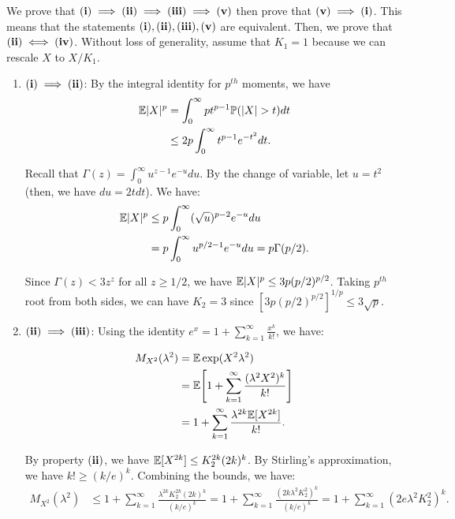\begin{proof*}
	We prove that ${\bf (i)}\implies{\bf (ii)}\implies{\bf (iii)}\implies{\bf (v)}$ then prove that ${\bf (v)}\implies{\bf (i)}$. This means that the statements ${\bf (i)}, {\bf (ii)}, {\bf (iii)}, {\bf (v)}$ are equivalent. Then, we prove that ${\bf (ii)} \iff {\bf (iv)}$. Without loss of generality, assume that $K_1=1$ because we can rescale $X$ to $X/K_1$.
	\begin{enumerate}
		\item ${\bf (i)}\implies{\bf (ii)}$: By the integral identity for $p^{th}$ moments, we have
		\begin{align*}
			\E|X|^p &= \int_0^\infty pt^{p-1}\Pm(|X|>t)dt \\
				&\le 2p\int_0^\infty t^{p-1}e^{-t^2}dt.
		\end{align*}

		\noindent Recall that $\Gamma(z) = \int_0^\infty u^{z-1}e^{-u}du$. By the change of variable, let $u=t^2$ (then, we have $du = 2tdt$). We have:
		\begin{align*}
			\mathbb{E}|X|^p &\le p\int_0^\infty (\sqrt{u})^{p-2}e^{-u}du \\
				&= p\int_0^\infty u^{p/2 - 1}e^{-u}du = p\Gamma(p/2).
		\end{align*} 

		\noindent Since $\Gamma(z) < 3z^z$ for all $z\ge 1/2$, we have $\mathbb{E}|X|^p \le 3p(p/2)^{p/2}$. Taking $p^{th}$ root from both sides, we can have $K_2=3$ since $[3p(p/2)^{p/2}]^{1/p} \le 3\sqrt{p}$.

		\item ${\bf (ii)}\implies{\bf (iii)}$: Using the identity $e^x = 1 + \sum_{k=1}^\infty \frac{x^k}{k!}$, we have:

		\begin{align*}
			M_{X^2}(\lambda^2) &= \mathbb{E}\exp(X^2\lambda^2) \\
				&= \mathbb{E}\Bigg[ 
					1 + \sum_{k=1}^\infty \frac{(\lambda^2X^2)^k}{k!}
				 \Bigg] \\
				&= 1 + \sum_{k=1}^\infty \frac{\lambda^{2k} \mathbb{E}[X^{2k}]}{k!}.
		\end{align*} 

		\noindent By property ${\bf (ii)}$, we have $\mathbb{E}[X^{2k}] \le K_2^{2k}(2k)^{k}$. By Stirling's approximation, we have $k!\ge(k/e)^k$. Combining the bounds, we have:
		\begin{align*}
			M_{X^2}(\lambda^2) &\le 1 + \sum_{k=1}^\infty \frac{\lambda^{2k}K_2^{2k}(2k)^k}{(k/e)^k}= 1 + \sum_{k=1}^\infty \frac{(2k\lambda^2K_2^2)^k}{(k/e)^k} = 1 + \sum_{k=1}^\infty (2e\lambda^2K_2^2)^k.
		\end{align*} 


\end{enumerate}
\end{proof*}
